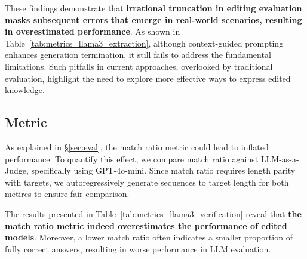 These findings demonstrate that \textbf{irrational truncation in editing evaluation masks subsequent errors that emerge in real-world scenarios, resulting in overestimated performance}.
As shown in Table~\ref{tab:metrics_llama3_extraction}, although context-guided prompting enhances generation termination, it still fails to address the fundamental limitations. 
Such pitfalls in current approaches, overlooked by traditional evaluation, highlight the need to explore more effective ways to express edited knowledge.


\subsection{Metric}
\label{sec:analysis_metric}


As explained in \S\ref{sec:eval}, the match ratio metric could lead to inflated performance.
To quantify this effect, we compare match ratio against LLM-as-a-Judge, specifically using GPT-4o-mini.
Since match ratio requires length parity with targets, we autoregressively generate sequences to target length for both metircs to ensure fair comparison.

The results presented in Table~\ref{tab:metrics_llama3_verification} reveal that \textbf{the match ratio metric indeed overestimates the performance of edited models}. 
Moreover, a lower match ratio often indicates a smaller proportion of fully correct answers, resulting in worse performance in LLM evaluation.
